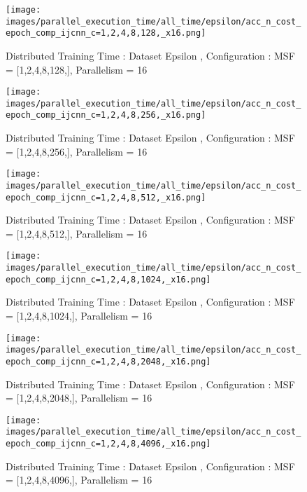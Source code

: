 \begin{figure*}[htbp]
\centering
\texttt{[image: images/parallel\_execution\_time/all\_time/epsilon/acc\_n\_cost\_epoch\_comp\_ijcnn\_c=1,2,4,8,128,\_x16.png]}
\caption{Distributed Training Time : Dataset Epsilon , Configuration : MSF = [1,2,4,8,128,], Parallelism = 16}
\label{fig:dis-msf-tr-time-epsilon-x16}
\end{figure*}


\begin{figure*}[htbp]
\centering
\texttt{[image: images/parallel\_execution\_time/all\_time/epsilon/acc\_n\_cost\_epoch\_comp\_ijcnn\_c=1,2,4,8,256,\_x16.png]}
\caption{Distributed Training Time : Dataset Epsilon , Configuration : MSF = [1,2,4,8,256,], Parallelism = 16}
\label{fig:dis-msf-tr-time-epsilon-x16}
\end{figure*}


\begin{figure*}[htbp]
\centering
\texttt{[image: images/parallel\_execution\_time/all\_time/epsilon/acc\_n\_cost\_epoch\_comp\_ijcnn\_c=1,2,4,8,512,\_x16.png]}
\caption{Distributed Training Time : Dataset Epsilon , Configuration : MSF = [1,2,4,8,512,], Parallelism = 16}
\label{fig:dis-msf-tr-time-epsilon-x16}
\end{figure*}


\begin{figure*}[htbp]
\centering
\texttt{[image: images/parallel\_execution\_time/all\_time/epsilon/acc\_n\_cost\_epoch\_comp\_ijcnn\_c=1,2,4,8,1024,\_x16.png]}
\caption{Distributed Training Time : Dataset Epsilon , Configuration : MSF = [1,2,4,8,1024,], Parallelism = 16}
\label{fig:dis-msf-tr-time-epsilon-x16}
\end{figure*}


\begin{figure*}[htbp]
\centering
\texttt{[image: images/parallel\_execution\_time/all\_time/epsilon/acc\_n\_cost\_epoch\_comp\_ijcnn\_c=1,2,4,8,2048,\_x16.png]}
\caption{Distributed Training Time : Dataset Epsilon , Configuration : MSF = [1,2,4,8,2048,], Parallelism = 16}
\label{fig:dis-msf-tr-time-epsilon-x16}
\end{figure*}


\begin{figure*}[htbp]
\centering
\texttt{[image: images/parallel\_execution\_time/all\_time/epsilon/acc\_n\_cost\_epoch\_comp\_ijcnn\_c=1,2,4,8,4096,\_x16.png]}
\caption{Distributed Training Time : Dataset Epsilon , Configuration : MSF = [1,2,4,8,4096,], Parallelism = 16}
\label{fig:dis-msf-tr-time-epsilon-x16}
\end{figure*}


